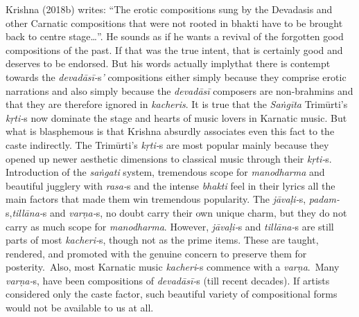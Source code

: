 Krishna (2018b) writes: “The erotic compositions sung by the Devadasis and other Carnatic compositions that were not rooted in bhakti have to be brought back to centre stage…”. He sounds as if he wants a revival of the forgotten good compositions of the past. If that was the true intent, that is certainly good and deserves to be endorsed. But his words actually implythat there is contempt towards the \textit{devadāsī-}s\textit{’} compositions either simply because they comprise erotic narrations and also simply because the \textit{devadāsī} composers are non-brahmins and that they are therefore ignored in \textit{kacheris}. It is true that the \textit{Saṅgīta} Trimūrti’s \textit{kṛti-}s now dominate the stage and hearts of music lovers in Karnatic music. But what is blasphemous is that Krishna absurdly associates even this fact to the caste indirectly. The Trimūrti’s \textit{kṛti-}s are most popular mainly because they opened up newer aesthetic dimensions to classical music through their \textit{kṛti-}s. Introduction of the \textit{saṅgati} system, tremendous scope for \textit{manodharma} and beautiful jugglery with \textit{rasa-}s and the intense \textit{bhakti} feel in their lyrics all the main factors that made them win tremendous popularity. The \textit{jāvaḷi-}s, \textit{padam-}s,\textit{tillāna-}s and \textit{varṇa-}s, no doubt carry their own unique charm, but they do not carry as much scope for \textit{manodharma}. However, \textit{jāvaḷi-}s and \textit{tillāna-}s are still parts of most \textit{kacheri-}s, though not as the prime items. These are taught, rendered, and promoted with the genuine concern to preserve them for posterity.~Also, most Karnatic music \textit{kacheri}-s commence with a \textit{varṇa}.~Many \textit{varṇa-}s, have been compositions of \textit{devadāsī-}s (till recent decades). If artists considered only the caste factor, such beautiful variety of compositional forms would not be available to us at all.

\vspace{-.3cm}

